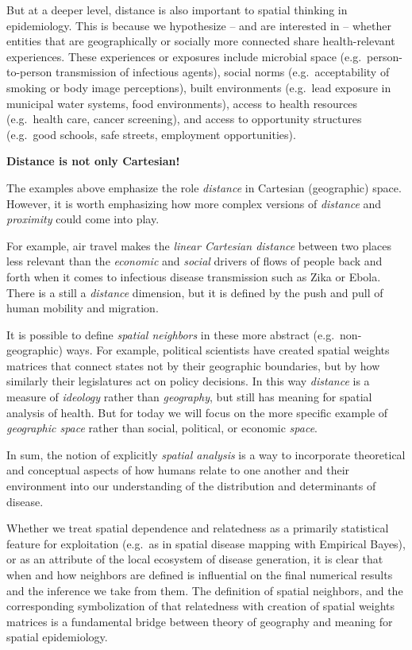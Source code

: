 \documentclass[
]{book}
\newenvironment{rmdnote}[1]
  {
  \begin{itemize}
  \renewcommand{\labelitemi}{
    \raisebox{-.7\height}[0pt][0pt]{
      {\setkeys{Gin}{width=3em,keepaspectratio}\texttt{[image: images/\#1]}}
    }
  }
  \setlength{\fboxsep}{1em}
  \begin{note}
  \item
  }
  {
  \end{note}
  \end{itemize}
  }
\begin{document}
But at a deeper level, distance is also important to spatial thinking in epidemiology. This is because we hypothesize -- and are interested in -- whether entities that are geographically or socially more connected share health-relevant experiences. These experiences or exposures include microbial space (e.g.~person-to-person transmission of infectious agents), social norms (e.g.~acceptability of smoking or body image perceptions), built environments (e.g.~lead exposure in municipal water systems, food environments), access to health resources (e.g.~health care, cancer screening), and access to opportunity structures (e.g.~good schools, safe streets, employment opportunities).

\begin{rmdnote}{note}
\textbf{Distance is not only Cartesian!}

The examples above emphasize the role \emph{distance} in Cartesian (geographic) space. However, it is worth emphasizing how more complex versions of \emph{distance} and \emph{proximity} could come into play.

For example, air travel makes the \emph{linear Cartesian distance} between two places less relevant than the \emph{economic} and \emph{social} drivers of flows of people back and forth when it comes to infectious disease transmission such as Zika or Ebola. There is a still a \emph{distance} dimension, but it is defined by the push and pull of human mobility and migration.

It is possible to define \emph{spatial neighbors} in these more abstract (e.g.~non-geographic) ways. For example, political scientists have created spatial weights matrices that connect states not by their geographic boundaries, but by how similarly their legislatures act on policy decisions. In this way \emph{distance} is a measure of \emph{ideology} rather than \emph{geography}, but still has meaning for spatial analysis of health. But for today we will focus on the more specific example of \emph{geographic space} rather than social, political, or economic \emph{space}.

\end{rmdnote}

In sum, the notion of explicitly \emph{spatial analysis} is a way to incorporate theoretical and conceptual aspects of how humans relate to one another and their environment into our understanding of the distribution and determinants of disease.

Whether we treat spatial dependence and relatedness as a primarily statistical feature for exploitation (e.g.~as in spatial disease mapping with Empirical Bayes), or as an attribute of the local ecosystem of disease generation, it is clear that when and how neighbors are defined is influential on the final numerical results and the inference we take from them. The definition of spatial neighbors, and the corresponding symbolization of that relatedness with creation of spatial weights matrices is a fundamental bridge between theory of geography and meaning for spatial epidemiology.
\end{document}
